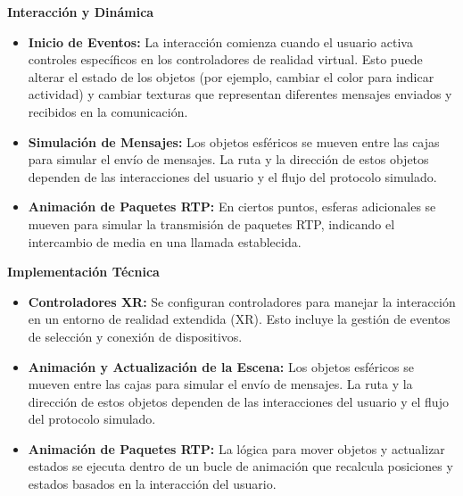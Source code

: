 \documentclass[a4paper, 12pt]{book}
\begin{document}
\textbf{Interacción y Dinámica}

\begin{itemize}
  \item \textbf{Inicio de Eventos:} La interacción comienza cuando el usuario activa controles específicos en los controladores de realidad virtual. 
  Esto puede alterar el estado de los objetos (por ejemplo, cambiar el color para indicar actividad) y cambiar texturas que 
  representan diferentes mensajes enviados y recibidos en la comunicación.
  
  \item \textbf{Simulación de Mensajes:} Los objetos esféricos se mueven entre las cajas para simular el envío de mensajes. 
  La ruta y la dirección de estos objetos dependen de las interacciones del usuario y el flujo del protocolo simulado.

  \item \textbf{Animación de Paquetes RTP:} En ciertos puntos, esferas adicionales se mueven para simular la transmisión de paquetes RTP, 
  indicando el intercambio de media en una llamada establecida.
  
\end{itemize}


\textbf{Implementación Técnica}

\begin{itemize}
  \item \textbf{Controladores XR:} Se configuran controladores para manejar la interacción en un entorno de realidad extendida (XR). 
  Esto incluye la gestión de eventos de selección y conexión de dispositivos.
  
  \item \textbf{Animación y Actualización de la Escena:} Los objetos esféricos se mueven entre las cajas para simular el envío de mensajes. 
  La ruta y la dirección de estos objetos dependen de las interacciones del usuario y el flujo del protocolo simulado.

  \item \textbf{Animación de Paquetes RTP:} La lógica para mover objetos y actualizar estados se ejecuta dentro de un bucle 
  de animación que recalcula posiciones y estados basados en la interacción del usuario.
  
\end{itemize}
\end{document}
